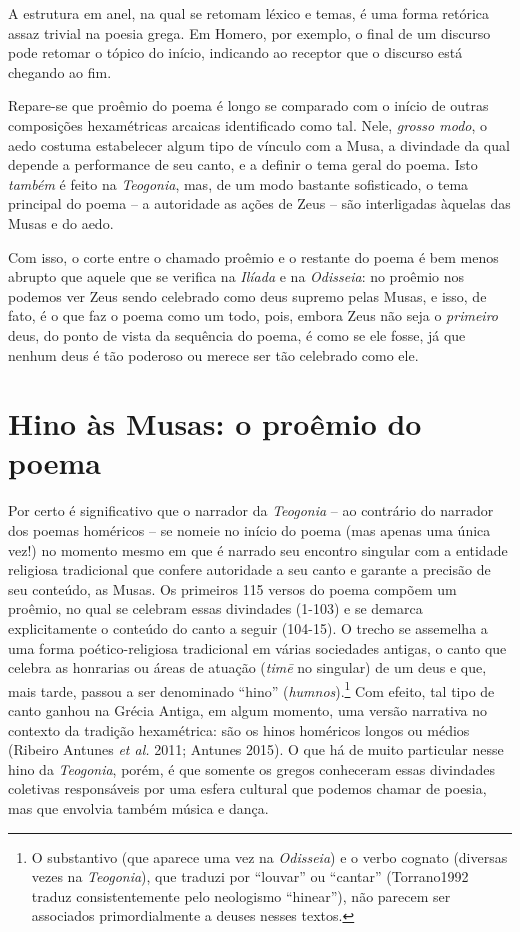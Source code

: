 A estrutura em anel, na qual se retomam léxico e temas, é uma forma
retórica assaz trivial na poesia grega. Em Homero, por exemplo, o final
de um discurso pode retomar o tópico do início, indicando ao receptor
que o discurso está chegando ao fim.

Repare-se que proêmio do poema é longo se comparado com o início de
outras composições hexamétricas arcaicas identificado como tal. Nele,
\emph{grosso modo}, o aedo costuma estabelecer algum tipo de vínculo com
a Musa, a divindade da qual depende a performance de seu canto, e a
definir o tema geral do poema. Isto \emph{também} é feito na
\emph{Teogonia}, mas, de um modo bastante sofisticado, o tema principal
do poema -- a autoridade as ações de Zeus -- são interligadas àquelas
das Musas e do aedo.

Com isso, o corte entre o chamado proêmio e o restante do poema é bem
menos abrupto que aquele que se verifica na \emph{Ilíada} e na
\emph{Odisseia}: no proêmio nos podemos ver Zeus sendo celebrado como
deus supremo pelas Musas, e isso, de fato, é o que faz o poema como um
todo, pois, embora Zeus não seja o \emph{primeiro} deus, do ponto de
vista da sequência do poema, é como se ele fosse, já que nenhum deus é
tão poderoso ou merece ser tão celebrado como ele.

\section{Hino às Musas: o proêmio do poema}

Por certo é significativo que o narrador da \emph{Teogonia} -- ao
contrário do narrador dos poemas homéricos -- se nomeie no início do
poema (mas apenas uma única vez!) no momento mesmo em que é narrado seu
encontro singular com a entidade religiosa tradicional que confere
autoridade a seu canto e garante a precisão de seu conteúdo, as Musas.
Os primeiros 115 versos do poema compõem um proêmio, no qual se celebram
essas divindades (1-103) e se demarca explicitamente o conteúdo do canto
a seguir (104-15). O trecho se assemelha a uma forma poético-religiosa
tradicional em várias sociedades antigas, o canto que celebra as
honrarias ou áreas de atuação (\emph{timē} no singular) de um deus e
que, mais tarde, passou a ser denominado ``hino''
(\emph{humnos}).\footnote{O substantivo (que aparece uma vez na
  \emph{Odisseia}) e o verbo cognato (diversas vezes na
  \emph{Teogonia}), que traduzi por ``louvar'' ou ``cantar''
  (Torrano1992 traduz consistentemente pelo neologismo ``hinear''), não
  parecem ser associados primordialmente a deuses nesses textos.} Com
efeito, tal tipo de canto ganhou na Grécia Antiga, em algum momento, uma
versão narrativa no contexto da tradição hexamétrica: são os hinos
homéricos longos ou médios (Ribeiro Antunes \emph{et al.} 2011; Antunes
2015). O que há de muito particular nesse hino da \emph{Teogonia},
porém, é que somente os gregos conheceram essas divindades coletivas
responsáveis por uma esfera cultural que podemos chamar de poesia, mas
que envolvia também música e dança.

